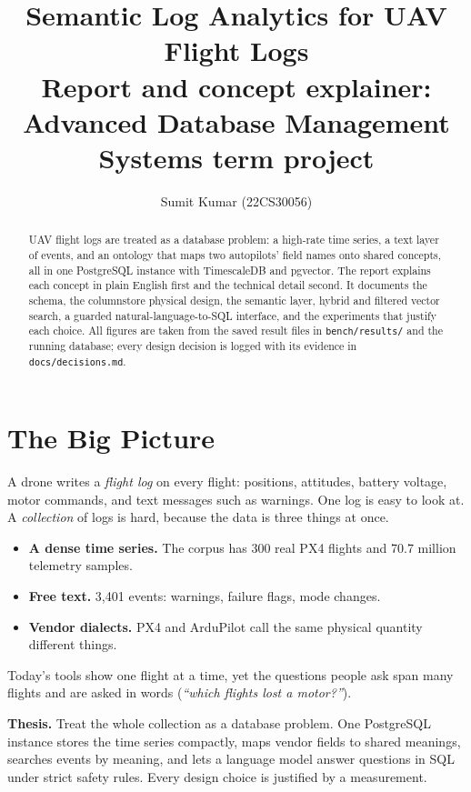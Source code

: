 \documentclass[11pt,a4paper]{article}
\title{\textbf{Semantic Log Analytics for UAV Flight Logs}\\[0.3em]\large Report and concept explainer: Advanced Database Management Systems term project}
\author{Sumit Kumar (22CS30056)}
\date{}
\newcommand{\code}[1]{\texttt{#1}}
\begin{document}
\maketitle
\thispagestyle{fancy}

\begin{abstract}
\noindent UAV flight logs are treated as a database problem: a high-rate time series, a text layer of events, and an ontology that maps two autopilots' field names onto shared concepts, all in one PostgreSQL instance with TimescaleDB and pgvector. The report explains each concept in plain English first and the technical detail second. It documents the schema, the columnstore physical design, the semantic layer, hybrid and filtered vector search, a guarded natural-language-to-SQL interface, and the experiments that justify each choice. All figures are taken from the saved result files in \code{bench/results/} and the running database; every design decision is logged with its evidence in \code{docs/decisions.md}.
\end{abstract}

\tableofcontents
\newpage

\section{The Big Picture}
A drone writes a \emph{flight log} on every flight: positions, attitudes, battery voltage, motor commands, and text messages such as warnings. One log is easy to look at. A \emph{collection} of logs is hard, because the data is three things at once.
\begin{itemize}
  \item \textbf{A dense time series.} The corpus has 300 real PX4 flights and 70.7 million telemetry samples.
  \item \textbf{Free text.} 3,401 events: warnings, failure flags, mode changes.
  \item \textbf{Vendor dialects.} PX4 and ArduPilot call the same physical quantity different things.
\end{itemize}
Today's tools show one flight at a time, yet the questions people ask span many flights and are asked in words (\emph{``which flights lost a motor?''}).

\begin{keyconcept}
\textbf{Thesis.} Treat the whole collection as a database problem. One PostgreSQL instance stores the time series compactly, maps vendor fields to shared meanings, searches events by meaning, and lets a language model answer questions in SQL under strict safety rules. Every design choice is justified by a measurement.
\end{keyconcept}
\end{document}
